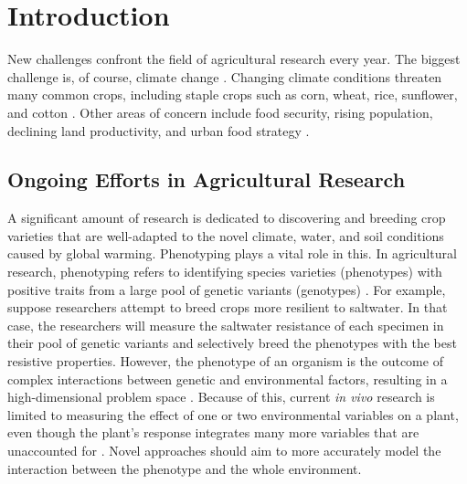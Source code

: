 
\chapter{Introduction} \label{chapter:intro}

New challenges confront the field of agricultural research every year.
The biggest challenge is, of course, climate change \citep{bisoffi_meta-analysis_2019}.
Changing climate conditions threaten many common crops, including staple crops such as corn, wheat, rice, sunflower, and cotton \citep{hatfield_ch_2014}.
Other areas of concern include food security, rising population, declining land productivity, and urban food strategy \citep{european_commission_directorate_general_for_research_and_innovation_new_2009, european_commission_directorate_general_for_research_and_innovation_resilience_2020}.

\section{Ongoing Efforts in Agricultural Research}

A significant amount of research is dedicated to discovering and breeding crop varieties that are well-adapted to the novel climate, water, and soil conditions caused by global warming.
Phenotyping plays a vital role in this.
In agricultural research, phenotyping refers to identifying species varieties (phenotypes) with positive traits from a large pool of genetic variants (genotypes) \citep{walter_plant_2015}.
For example, suppose researchers attempt to breed crops more resilient to saltwater. 
In that case, the researchers will measure the saltwater resistance of each specimen in their pool of genetic variants and selectively breed the phenotypes with the best resistive properties.
However, the phenotype of an organism is the outcome of complex interactions between genetic and environmental factors, resulting in a high-dimensional problem space \citep{walter_plant_2015}. 
Because of this, current \textit{in vivo} research is limited to measuring the effect of one or two environmental variables on a plant, even though the plant's response integrates many more variables that are unaccounted for \citep{pieters_reservoir_2022}. 
Novel approaches should aim to more accurately model the interaction between the phenotype and the whole environment.


